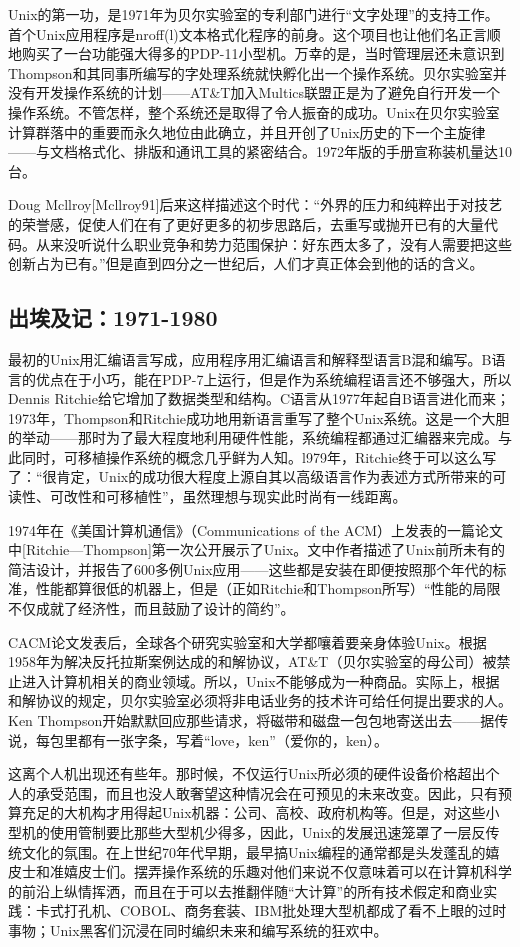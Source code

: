 \documentclass[11pt,oneside]{book}
\begin{document}
\begin{common-format}
Unix的第一功，是1971年为贝尔实验室的专利部门进行“文字处理”的支持工作。首个Unix应用程序是nroff(l)文本格式化程序的前身。这个项目也让他们名正言顺地购买了一台功能强大得多的PDP-11小型机。万幸的是，当时管理层还未意识到Thompson和其同事所编写的字处理系统就快孵化出一个操作系统。贝尔实验室并没有开发操作系统的计划——AT\&{}T加入Multics联盟正是为了避免自行开发一个操作系统。不管怎样，整个系统还是取得了令人振奋的成功。Unix在贝尔实验室计算群落中的重要而永久地位由此确立，并且开创了Unix历史的下一个主旋律——与文档格式化、排版和通讯工具的紧密结合。1972年版的手册宣称装机量达10台。

Doug Mcllroy[Mcllroy91]后来这样描述这个时代：“外界的压力和纯粹出于对技艺的荣誉感，促使人们在有了更好更多的初步思路后，去重写或抛开已有的大量代码。从来没听说什么职业竞争和势力范围保护：好东西太多了，没有人需要把这些创新占为已有。”但是直到四分之一世纪后，人们才真正体会到他的话的含义。


\subsection{出埃及记：1971-1980}
最初的Unix用汇编语言写成，应用程序用汇编语言和解释型语言B混和编写。B语言的优点在于小巧，能在PDP-7上运行，但是作为系统编程语言还不够强大，所以Dennis Ritchie给它增加了数据类型和结构。C语言从1977年起自B语言进化而来；1973年，Thompson和Ritchie成功地用新语言重写了整个Unix系统。这是一个大胆的举动——那时为了最大程度地利用硬件性能，系统编程都通过汇编器来完成。与此同时，可移植操作系统的概念几乎鲜为人知。l979年，Ritchie终于可以这么写了：“很肯定，Unix的成功很大程度上源自其以高级语言作为表述方式所带来的可读性、可改性和可移植性”，虽然理想与现实此时尚有一线距离。

1974年在《美国计算机通信》（Communications of the ACM\linebreak ）上发表的一篇论文中[Ritchie—Thompson]第一次公开展示了Unix。文中作者描述了Unix前所未有的简洁设计，并报告了600多例Unix应用——这些都是安装在即便按照那个年代的标准，性能都算很低的机器上，但是（正如Ritchie和Thompson所写）“性能的局限不仅成就了经济性，而且鼓励了设计的简约”。

CACM论文发表后，全球各个研究实验室和大学都嚷着要亲身体验Unix。根据1958年为解决反托拉斯案例达成的和解协议，AT\&{}T（贝尔实验室的母公司）被禁止进入计算机相关的商业领域。所以，Unix不能够成为一种商品。实际上，根据和解协议的规定，贝尔实验室必须将非电话业务的技术许可给任何提出要求的人。Ken Thompson开始默默回应那些请求，将磁带和磁盘一包包地寄送出去——据传说，每包里都有一张字条，写着“love，ken”（爱你的，ken）。

这离个人机出现还有些年。那时候，不仅运行Unix所必须的硬件设备价格超出个人的承受范围，而且也没人敢奢望这种情况会在可预见的未来改变。因此，只有预算充足的大机构才用得起Unix机器：公司、高校、政府机构等。但是，对这些小型机的使用管制要比那些大型机少得多，因此，Unix的发展迅速笼罩了一层反传统文化的氛围。在上世纪70年代早期，最早搞Unix编程的通常都是头发蓬乱的嬉皮士和准嬉皮士们。摆弄操作系统的乐趣对他们来说不仅意味着可以在计算机科学的前沿上纵情挥洒，而且在于可以去推翻伴随“大计算”的所有技术假定和商业实践：卡式打孔机、COBOL、商务套装、IBM批处理大型机都成了看不上眼的过时事物；Unix黑客们沉浸在同时编织未来和编写系统的狂欢中。


\end{common-format}
\end{document}
